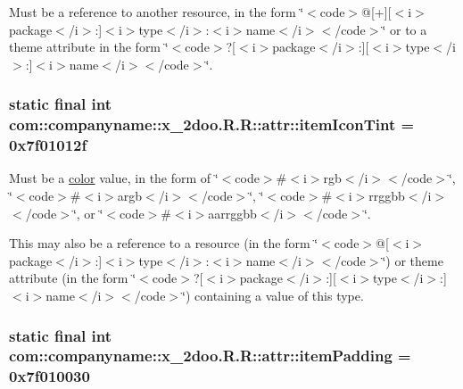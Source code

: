 Must be a reference to another resource, in the form \char`\"{}$<$code$>$@\mbox{[}+\mbox{]}\mbox{[}$<$i$>$package$<$/i$>$:\mbox{]}$<$i$>$type$<$/i$>$:$<$i$>$name$<$/i$>$$<$/code$>$\char`\"{} or to a theme attribute in the form \char`\"{}$<$code$>$?\mbox{[}$<$i$>$package$<$/i$>$:\mbox{]}\mbox{[}$<$i$>$type$<$/i$>$:\mbox{]}$<$i$>$name$<$/i$>$$<$/code$>$\char`\"{}. \hypertarget{classcom_1_1companyname_1_1x__2doo_1_1_r_1_1attr_d180f97cceb2f27d8105134eeb91445f}{
\subsubsection[{itemIconTint}]{\setlength{\rightskip}{0pt plus 5cm}static final int com::companyname::x\_\-2doo.R.R::attr::itemIconTint = 0x7f01012f}}
\label{classcom_1_1companyname_1_1x__2doo_1_1_r_1_1attr_d180f97cceb2f27d8105134eeb91445f}


Must be a \hyperlink{classcom_1_1companyname_1_1x__2doo_1_1_r_1_1color}{color} value, in the form of \char`\"{}$<$code$>$\#$<$i$>$rgb$<$/i$>$$<$/code$>$\char`\"{}, \char`\"{}$<$code$>$\#$<$i$>$argb$<$/i$>$$<$/code$>$\char`\"{}, \char`\"{}$<$code$>$\#$<$i$>$rrggbb$<$/i$>$$<$/code$>$\char`\"{}, or \char`\"{}$<$code$>$\#$<$i$>$aarrggbb$<$/i$>$$<$/code$>$\char`\"{}. 

This may also be a reference to a resource (in the form \char`\"{}$<$code$>$@\mbox{[}$<$i$>$package$<$/i$>$:\mbox{]}$<$i$>$type$<$/i$>$:$<$i$>$name$<$/i$>$$<$/code$>$\char`\"{}) or theme attribute (in the form \char`\"{}$<$code$>$?\mbox{[}$<$i$>$package$<$/i$>$:\mbox{]}\mbox{[}$<$i$>$type$<$/i$>$:\mbox{]}$<$i$>$name$<$/i$>$$<$/code$>$\char`\"{}) containing a value of this type. \hypertarget{classcom_1_1companyname_1_1x__2doo_1_1_r_1_1attr_7e7c0aab964f70ae22793222d508c798}{
\subsubsection[{itemPadding}]{\setlength{\rightskip}{0pt plus 5cm}static final int com::companyname::x\_\-2doo.R.R::attr::itemPadding = 0x7f010030}}
\label{classcom_1_1companyname_1_1x__2doo_1_1_r_1_1attr_7e7c0aab964f70ae22793222d508c798}


